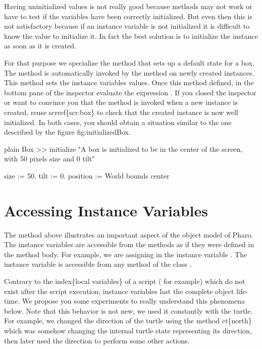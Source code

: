 \documentclass[10pt,twoside,english]{_support/latex/sbabook/sbabook}
\begin{document}
Having uninitialized values is not really good because methods may not
work or have to test if the variables have been correctly initialized. 
But even then this is not satisfactory because if an instance variable
is not initialized it is difficult to know the value to initialize it. 
In fact the best solution is to initialize the instance as soon as it
is created.  

For that purpose we specialize the method  that sets up
a default state for a box.  The method  is
automatically invoked by the method  on newly created
instances.  This method sets the instance variables values.  Once this
method defined, in the bottom pane of the inspector evaluate the expression 
. If you closed the inspector or want to convince you that the method  is invoked when a new instance is created,  reuse scrref\{scr:box\} to check that the created
instance is now well initialized. In both cases, you should obtain a situation 
similar to the one described by the figure fig:initializedBox.

\begin{displaycode}{plain}
Box >> initialize
	"A box is initialized to be in the center of the screen, with 
	50 pixels size and 0 tilt"
	
	size := 50.
	tilt := 0.
	position := World bounds center
\end{displaycode}
\section{Accessing Instance Variables}
The method  above illustrates an important aspect of
the object model of Pharo. The instance variables are accessible from
the methods as if they were defined in the method body. For example, 
we are assigning  in the instance variable . The instance 
variable  is accessible from any method of the class .

Contrary to the index\{local variables\}  of a
script  ( for example) which do not exist after the script execution, instance
variables last the complete object life-time.  We propose you some
experiments to really understand this phenomena below.  Note that this
behavior is not new, we used it constantly with the turtle.  For
example, we changed the direction of the turtle using the method
ct\{north\} which was somehow changing the internal turtle state representing its direction, then later used the direction to perform some other actions.
\end{document}
